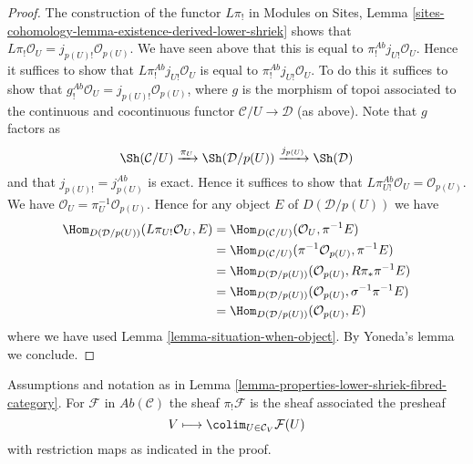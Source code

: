 \begin{proof}
\medskip\noindent
The construction of the functor $L\pi_!$ in
Modules on Sites, Lemma
\ref{sites-cohomology-lemma-existence-derived-lower-shriek}
shows that $L\pi_!\mathcal{O}_U = j_{p(U)!}\mathcal{O}_{p(U)}$.
We have seen above that this is equal to
$\pi_!^{\textit{Ab}}j_{U!}\mathcal{O}_U$.
Hence it suffices to show that $L\pi_!^{\textit{Ab}}j_{U!}\mathcal{O}_U$
is equal to $\pi_!^{\textit{Ab}}j_{U!}\mathcal{O}_U$.
To do this it suffices to show that
$g_!^{\textit{Ab}}\mathcal{O}_U = j_{p(U)!}\mathcal{O}_{p(U)}$,
where $g$ is the morphism of topoi associated to the continuous and
cocontinuous functor $\mathcal{C}/U \to \mathcal{D}$ (as above).
Note that $g$ factors as
$$
\Sh(\mathcal{C}/U) \xrightarrow{\pi_U} \Sh(\mathcal{D}/p(U))
\xrightarrow{j_{p(U)}} \Sh(\mathcal{D})
$$
and that $j_{p(U)!} = j_{p(U)}^{\textit{Ab}}$ is exact. Hence it suffices
to show that $L\pi_{U!}^{\textit{Ab}}\mathcal{O}_U = \mathcal{O}_{p(U)}$.
We have $\mathcal{O}_U = \pi_U^{-1}\mathcal{O}_{p(U)}$. Hence
for any object $E$ of $D(\mathcal{D}/p(U))$ we have
\begin{align*}
\Hom_{D(\mathcal{D}/p(U))}(L\pi_{U!}\mathcal{O}_U, E)
& =
\Hom_{D(\mathcal{C}/U)}(\mathcal{O}_U, \pi^{-1}E) \\
& =
\Hom_{D(\mathcal{C}/U)}(\pi^{-1}\mathcal{O}_{p(U)}, \pi^{-1}E) \\
& =
\Hom_{D(\mathcal{D}/p(U))}(\mathcal{O}_{p(U)}, R\pi_*\pi^{-1}E) \\
& =
\Hom_{D(\mathcal{D}/p(U))}(\mathcal{O}_{p(U)}, \sigma^{-1}\pi^{-1}E) \\
& =
\Hom_{D(\mathcal{D}/p(U))}(\mathcal{O}_{p(U)}, E)
\end{align*}
where we have used Lemma \ref{lemma-situation-when-object}.
By Yoneda's lemma we conclude.
\end{proof}

\begin{lemma}
\label{lemma-compute-pi-shriek}
Assumptions and notation as in
Lemma \ref{lemma-properties-lower-shriek-fibred-category}.
For $\mathcal{F}$ in $\textit{Ab}(\mathcal{C})$
the sheaf $\pi_!\mathcal{F}$ is the
sheaf associated the presheaf
$$
V \longmapsto \colim_{U \in \mathcal{C}_V} \mathcal{F}(U)
$$
with restriction maps as indicated in the proof.
\end{lemma}

